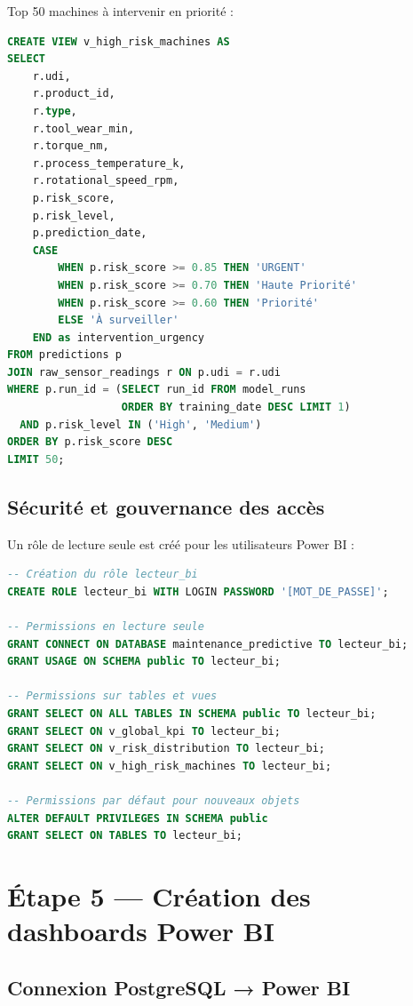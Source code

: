 \documentclass[a4paper,12pt,twoside]{report}
\begin{document}
Top 50 machines à intervenir en priorité :

\begin{lstlisting}[language=sql]
CREATE VIEW v_high_risk_machines AS
SELECT
    r.udi,
    r.product_id,
    r.type,
    r.tool_wear_min,
    r.torque_nm,
    r.process_temperature_k,
    r.rotational_speed_rpm,
    p.risk_score,
    p.risk_level,
    p.prediction_date,
    CASE 
        WHEN p.risk_score >= 0.85 THEN 'URGENT'
        WHEN p.risk_score >= 0.70 THEN 'Haute Priorité'
        WHEN p.risk_score >= 0.60 THEN 'Priorité'
        ELSE 'À surveiller'
    END as intervention_urgency
FROM predictions p
JOIN raw_sensor_readings r ON p.udi = r.udi
WHERE p.run_id = (SELECT run_id FROM model_runs 
                  ORDER BY training_date DESC LIMIT 1)
  AND p.risk_level IN ('High', 'Medium')
ORDER BY p.risk_score DESC
LIMIT 50;
\end{lstlisting}

\subsection{Sécurité et gouvernance des accès}

Un rôle de lecture seule est créé pour les utilisateurs Power BI :

\begin{lstlisting}[language=sql]
-- Création du rôle lecteur_bi
CREATE ROLE lecteur_bi WITH LOGIN PASSWORD '[MOT_DE_PASSE]';

-- Permissions en lecture seule
GRANT CONNECT ON DATABASE maintenance_predictive TO lecteur_bi;
GRANT USAGE ON SCHEMA public TO lecteur_bi;

-- Permissions sur tables et vues
GRANT SELECT ON ALL TABLES IN SCHEMA public TO lecteur_bi;
GRANT SELECT ON v_global_kpi TO lecteur_bi;
GRANT SELECT ON v_risk_distribution TO lecteur_bi;
GRANT SELECT ON v_high_risk_machines TO lecteur_bi;

-- Permissions par défaut pour nouveaux objets
ALTER DEFAULT PRIVILEGES IN SCHEMA public 
GRANT SELECT ON TABLES TO lecteur_bi;
\end{lstlisting}

\section{Étape 5 — Création des dashboards Power BI}

\subsection{Connexion PostgreSQL → Power BI}
\end{document}
